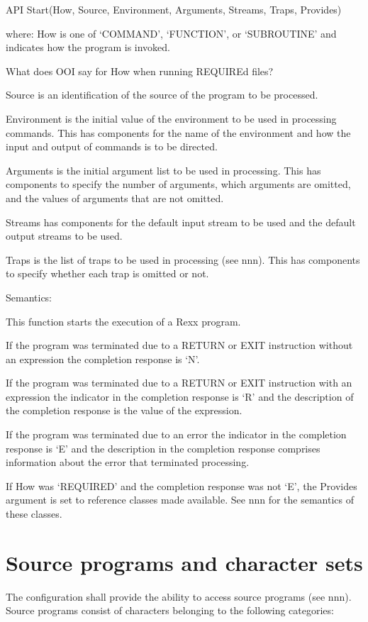 API Start(How, Source, Environment, Arguments, Streams, Traps, Provides)

where: How is one of `COMMAND', `FUNCTION', or `SUBROUTINE' and
indicates how the program is invoked.

What does OOI say for How when running REQUIREd files?

Source is an identification of the source of the program to be
processed.

Environment is the initial value of the environment to be used in
processing commands. This has components for the name of the environment
and how the input and output of commands is to be directed.

Arguments is the initial argument list to be used in processing. This
has components to specify the number of arguments, which arguments are
omitted, and the values of arguments that are not omitted.

Streams has components for the default input stream to be used and the
default output streams to be used.

Traps is the list of traps to be used in processing (see nnn). This has
components to specify whether each trap is omitted or not.

Semantics:

This function starts the execution of a Rexx program.

If the program was terminated due to a RETURN or EXIT instruction
without an expression the completion response is `N'.

If the program was terminated due to a RETURN or EXIT instruction with
an expression the indicator in the completion response is `R' and the
description of the completion response is the value of the expression.

If the program was terminated due to an error the indicator in the
completion response is `E' and the description in the completion
response comprises information about the error that terminated
processing.

If How was `REQUIRED' and the completion response was not `E', the
Provides argument is set to reference classes made available. See nnn
for the semantics of these classes.

\section{Source programs and character
sets}\label{source-programs-and-character-sets}

The configuration shall provide the ability to access source programs
(see nnn). Source programs consist of characters belonging to the
following categories:

